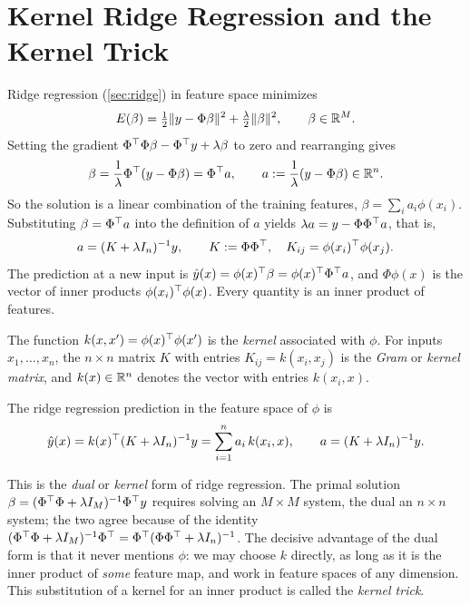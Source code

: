\section{Kernel Ridge Regression and the Kernel Trick}\label{sec:kernel-trick}

Ridge regression (\cref{sec:ridge}) in feature space minimizes
\[
E(\beta)=\tfrac12\lVert y-\Phi\beta\rVert^2+\tfrac\lambda2\lVert \beta\rVert^2,\qquad\beta\in\mathbb{R}^M.
\]
Setting the gradient $\Phi^{\top}\Phi\beta-\Phi^{\top} y+\lambda\beta$ to zero and rearranging gives
\[
\beta=\frac1\lambda\Phi^{\top}(y-\Phi\beta)=\Phi^{\top} a,\qquad a:=\frac1\lambda(y-\Phi\beta)\in\mathbb{R}^n.
\]
So the solution is a linear combination of the training features, $\beta=\sum_ia_i\phi(x_i)$. Substituting $\beta=\Phi^{\top} a$ into the definition of $a$ yields $\lambda a=y-\Phi\Phi^{\top} a$, that is,
\[
a=(K+\lambda I_n)^{-1}y,\qquad K:=\Phi\Phi^{\top},\quad K_{ij}=\phi(x_i)^{\top}\phi(x_j).
\]
The prediction at a new input is $\hat y(x)=\phi(x)^{\top}\beta=\phi(x)^{\top}\Phi^{\top} a$, and $\Phi\phi(x)$ is the vector of inner products $\phi(x_i)^{\top}\phi(x)$. Every quantity is an inner product of features.

\begin{definition}
The function $k(x,x')=\phi(x)^{\top}\phi(x')$ is the \emph{kernel} associated with $\phi$. For inputs $x_1,\dots,x_n$, the $n\times n$ matrix $K$ with entries $K_{ij}=k(x_i,x_j)$ is the \emph{Gram} or \emph{kernel matrix}, and $k(x)\in\mathbb{R}^n$ denotes the vector with entries $k(x_i,x)$.
\end{definition}

\begin{proposition}\label{prop:kernel-ridge}
The ridge regression prediction in the feature space of $\phi$ is
\[
\hat y(x)=k(x)^{\top}(K+\lambda I_n)^{-1}y=\sum_{i=1}^na_i\,k(x_i,x),\qquad a=(K+\lambda I_n)^{-1}y.
\]
\end{proposition}

This is the \emph{dual} or \emph{kernel} form of ridge regression. The primal solution $\beta=(\Phi^{\top}\Phi+\lambda I_M)^{-1}\Phi^{\top} y$ requires solving an $M\times M$ system, the dual an $n\times n$ system; the two agree because of the identity $(\Phi^{\top}\Phi+\lambda I_M)^{-1}\Phi^{\top}=\Phi^{\top}(\Phi\Phi^{\top}+\lambda I_n)^{-1}$. The decisive advantage of the dual form is that it never mentions $\phi$: we may choose $k$ directly, as long as it is the inner product of \emph{some} feature map, and work in feature spaces of any dimension. This substitution of a kernel for an inner product is called the \emph{kernel trick}.

